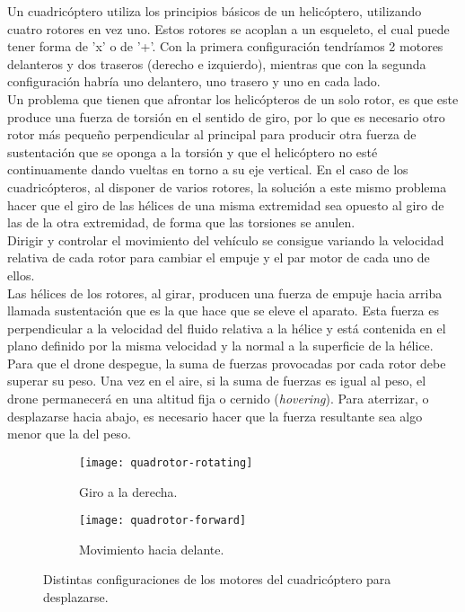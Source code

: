 Un cuadricóptero utiliza los principios básicos de un helicóptero, utilizando cuatro rotores en vez uno. Estos rotores se acoplan a un esqueleto, el cual puede tener forma de 'x' o de '+'. Con la primera configuración tendríamos 2 motores delanteros y dos traseros (derecho e izquierdo), mientras que con la segunda configuración habría uno delantero, uno trasero y uno en cada lado. \\

Un problema que tienen que afrontar los helicópteros de un solo rotor, es que este produce una fuerza de torsión en el sentido de giro, por lo que es necesario otro rotor más pequeño perpendicular al principal para producir otra fuerza de sustentación que se oponga a la torsión y que el helicóptero no esté continuamente dando vueltas en torno a su eje vertical. En el caso de los cuadricópteros, al disponer de varios rotores, la solución a este mismo problema hacer que el giro de las hélices de una misma extremidad sea opuesto al giro de las de la otra extremidad, de forma que las torsiones se anulen.\\

Dirigir y controlar el movimiento del vehículo se consigue variando la velocidad relativa de cada rotor para cambiar el empuje y el par motor de cada uno de ellos.\\

Las hélices de los rotores, al girar, producen una fuerza de empuje hacia arriba llamada sustentación que es la que hace que se eleve el aparato. Esta fuerza es perpendicular a la velocidad del fluido relativa a la hélice y está contenida en el plano definido por la misma velocidad y la normal a la superficie de la hélice. Para que el drone despegue, la suma de fuerzas provocadas por cada rotor debe superar su peso. Una vez en el aire, si la suma de fuerzas es igual al peso, el drone permanecerá en una altitud fija o cernido (\emph{hovering}). Para aterrizar, o desplazarse hacia abajo, es necesario hacer que la fuerza resultante sea algo menor que la del peso.\\


\begin{figure}[h]
\centering
  \begin{subfigure}[]{60mm}
    \texttt{[image: quadrotor-rotating]}
    \caption{Giro a la derecha.} 
  \end{subfigure}
  \hspace{5pt}
  \begin{subfigure}[]{60mm}
    \texttt{[image: quadrotor-forward]}
    \caption{Movimiento hacia delante.}
  \end{subfigure}
  \caption{Distintas configuraciones de los motores del cuadricóptero para desplazarse.}\label{fig:quadrotor_movements}
\end{figure}



